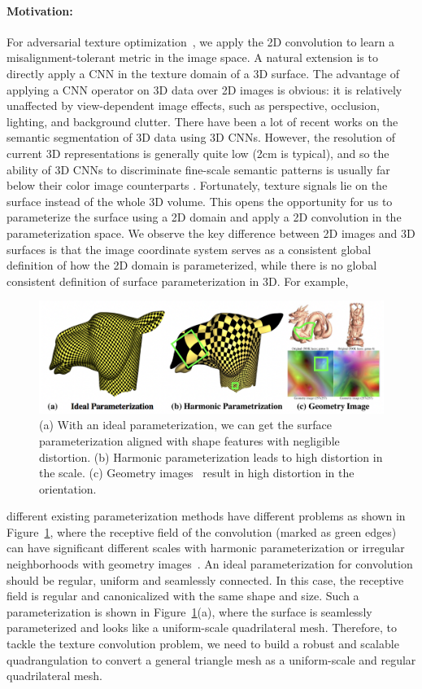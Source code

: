 \paragraph*{Motivation:} For adversarial texture optimization~\cite{huang2020adversarial}, we apply the 2D convolution to learn a misalignment-tolerant metric in the image space.
%
A natural extension is to directly apply a CNN in the texture domain of a 3D surface.
%
The advantage of applying a CNN operator on 3D data over 2D images is obvious: it is relatively unaffected by view-dependent image effects, such as perspective, occlusion, lighting, and background clutter.
%
There have been a lot of recent works on the semantic segmentation of 3D data using 3D CNNs. However, the resolution of current 3D representations is generally quite low (2cm is typical), and so the ability of 3D CNNs to discriminate fine-scale semantic patterns is usually far below their color image counterparts \cite{long2015fully,he2017mask}.
%
Fortunately, texture signals lie on the surface instead of the whole 3D volume. This opens the opportunity for us to parameterize the surface using a 2D domain and apply a 2D convolution in the parameterization space. We observe the key difference between 2D images and 3D surfaces is that the image coordinate system serves as a consistent global definition of how the 2D domain is parameterized, while there is no global consistent definition of surface parameterization in 3D. For example,
 \begin{figure}
    \centering
     \includegraphics[width=0.8\linewidth]{quadriflow/param.png}
     \caption{(a) With an ideal parameterization, we can get the surface parameterization aligned with shape features with negligible distortion. (b) Harmonic parameterization leads to high distortion in the scale. (c) Geometry images~\cite{gu2002geometry} result in high distortion in the orientation.}
     \label{fig:intro-quadriflow-param}
 \end{figure}
different existing parameterization methods have different problems as shown in Figure~\ref{fig:intro-quadriflow-param}, where the receptive field of the convolution (marked as green edges) can have significant different scales with harmonic parameterization or irregular neighborhoods with geometry images~\cite{gu2002geometry}. An ideal parameterization for convolution should be regular, uniform and seamlessly connected. In this case, the receptive field is regular and canonicalized with the same shape and size. Such a parameterization is shown in Figure~\ref{fig:intro-quadriflow-param}(a), where the surface is seamlessly parameterized and looks like a uniform-scale quadrilateral mesh. Therefore, to tackle the texture convolution problem, we need to build a robust and scalable quadrangulation to convert a general triangle mesh as a uniform-scale and regular quadrilateral mesh.

